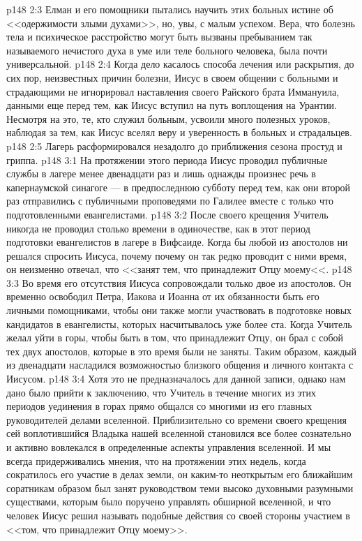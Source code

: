 \vs p148 2:3 Елман и его помощники пытались научить этих больных истине об <<одержимости злыми духами>>, но, увы, с малым успехом. Вера, что болезнь тела и психическое расстройство могут быть вызваны пребыванием так называемого нечистого духа в уме или теле больного человека, была почти универсальной.
\vs p148 2:4 Когда дело касалось способа лечения или раскрытия, до сих пор, неизвестных причин болезни, Иисус в своем общении с больными и страдающими не игнорировал наставления своего Райского брата Иммануила, данными еще перед тем, как Иисус вступил на путь воплощения на Урантии. Несмотря на это, те, кто служил больным, усвоили много полезных уроков, наблюдая за тем, как Иисус вселял веру и уверенность в больных и страдальцев.
\vs p148 2:5 Лагерь расформировался незадолго до приближения сезона простуд и гриппа.
\vs p148 3:1 На протяжении этого периода Иисус проводил публичные службы в лагере менее двенадцати раз и лишь однажды произнес речь в капернаумской синагоге --- в предпоследнюю субботу перед тем, как они второй раз отправились с публичными проповедями по Галилее вместе с только что подготовленными евангелистами.
\vs p148 3:2 После своего крещения Учитель никогда не проводил столько времени в одиночестве, как в этот период подготовки евангелистов в лагере в Вифсаиде. Когда бы любой из апостолов ни решался спросить Иисуса, почему почему он так редко проводит с ними время, он неизменно отвечал, что <<занят тем, что принадлежит Отцу моему<<.
\vs p148 3:3 Во время его отсутствия Иисуса сопровождали только двое из апостолов. Он временно освободил Петра, Иакова и Иоанна от их обязанности быть его личными помощниками, чтобы они также могли участвовать в подготовке новых кандидатов в евангелисты, которых насчитывалось уже более ста. Когда Учитель желал уйти в горы, чтобы быть в том, что принадлежит Отцу, он брал с собой тех двух апостолов, которые в это время были не заняты. Таким образом, каждый из двенадцати насладился возможностью близкого общения и личного контакта с Иисусом.
\vs p148 3:4 Хотя это не предназначалось для данной записи, однако нам дано было прийти к заключению, что Учитель в течение многих из этих периодов уединения в горах прямо общался со многими из его главных руководителей делами вселенной. Приблизительно со времени своего крещения сей воплотившийся Владыка нашей вселенной становился все более сознательно и активно вовлекался в определенные аспекты управления вселенной. И мы всегда придерживались мнения, что на протяжении этих недель, когда сократилось его участие в делах земли, он каким\hyp{}то неоткрытым его ближайшим соратникам образом был занят руководством теми высоко духовными разумными существами, которым было поручено управлять обширной вселенной, и что человек Иисус решил называть подобные действия со своей стороны участием в <<том, что принадлежит Отцу моему>>.
